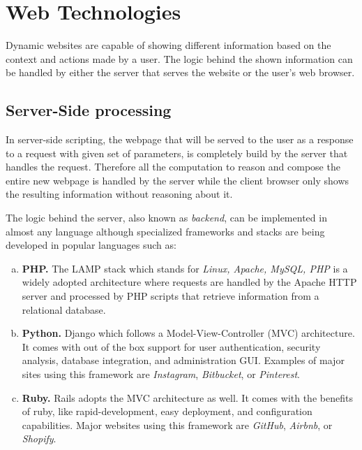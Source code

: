 \section{Web Technologies}
Dynamic websites are capable of showing different information based on the context and actions made by a user. The logic behind the shown information can be handled by either the server that serves the website or the user's web browser. 

\subsection{Server-Side processing}

In server-side scripting, the webpage that will be served to the user as a response to a request with given set of parameters, is completely build by the server that handles the request. Therefore all the computation to reason and compose the entire new webpage is handled by the server while the client browser only shows the resulting information without reasoning about it.

The logic behind the server, also known as \textit{backend}, can be implemented in almost any language although specialized frameworks and stacks are being developed in popular languages such as:

\begin{enumerate}[a)]
	\item \textbf{PHP.} The LAMP stack \cite{lamp} which stands for \textit{Linux, Apache, MySQL, PHP} is a widely adopted architecture where requests are handled by the Apache HTTP server and processed by PHP scripts that retrieve information from a relational database.

	\item \textbf{Python.} Django \cite{django} which follows a Model-View-Controller (MVC) architecture. It comes with out of the box support for user authentication, security analysis, database integration, and administration GUI. Examples of major sites using this framework are \textit{Instagram}, \textit{Bitbucket}, or \textit{Pinterest}. \cite{django-websites}
	
	\item \textbf{Ruby.} Rails adopts the MVC architecture as well. It comes with the benefits of ruby, like rapid-development, easy deployment, and configuration capabilities. Major websites using this framework are \textit{GitHub}, \textit{Airbnb}, or \textit{Shopify}. \cite{rails}
\end{enumerate}

